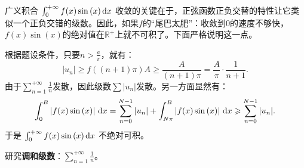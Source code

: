 \documentclass[12pt,UTF8]{ctexbook}
\begin{document}
\begin{so}
    广义积合 $\int_0^{+\infty} f(x) \sin{(x)} \,\mathrm{d}x$ 收敛的关键在于，正弦函数正负交替的特性让它类似一个正负交错的级数。因此，如果$f$的“尾巴太肥”：收敛到$0$的速度不够快，$f(x) \sin{(x)}$的绝对值在$\mathbb{R}^+$上就不可积了。下面严格说明这一点。
    
    根据题设条件，只要$\displaystyle n > \frac{a}{\pi}$，就有：
    $$ | u_n | \geqslant f((n+1)\pi)A \geqslant \frac{A}{(n+1)\pi} = \frac{A}{\pi} \cdot \frac{1}{n+1}. $$
    由于$\displaystyle \sum_{n=1}^{+\infty} \frac{1}{n}$发散，因此级数$\sum |u_n|$发散。另一方面显然有：
    $$ \int_0^{B} \left|f(x) \sin{(x)}\right| \,\mathrm{d}x = \sum_{n=0}^{N-1} |u_n| + \int_{N\pi}^{B} \left| f(x) \sin{(x)} \right| \,\mathrm{d}x \geqslant \sum_{n=0}^{N-1} |u_n|. $$
    于是 $\int_0^{+\infty} f(x) \sin{(x)} \,\mathrm{d}x$ 不绝对可积。 

\end{so}

\begin{et} 
    研究\textbf{调和级数}：$\displaystyle\sum_{n=1}^{+\infty} \frac{1}{n}$。
\end{et}
\end{document}
